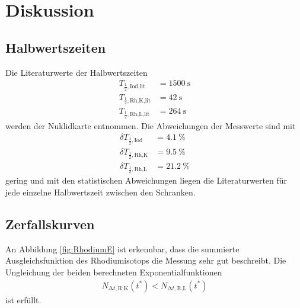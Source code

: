 \section{Diskussion}
\label{sec:Diskussion}

\subsection{Halbwertszeiten}

Die Literaturwerte der Halbwertszeiten
\begin{align}
  T_{\frac{1}{2},\text{Iod,lit}} & = \SI{1500}{\second} \\
  T_{\frac{1}{2},\text{Rh,K,lit}} & = \SI{42}{\second} \\
  T_{\frac{1}{2},\text{Rh,L,lit}} & = \SI{264}{\second}
\end{align}
werden der Nuklidkarte \cite{nuklid} entnommen.
Die Abweichungen der Messwerte sind mit
\begin{align}
  \delta T_{\frac{1}{2},\text{Iod}} & = \SI{4.1}{\percent} \\
  \delta T_{\frac{1}{2},\text{Rh,K}} & = \SI{9.5}{\percent} \\
  \delta T_{\frac{1}{2},\text{Rh,L}} & = \SI{21.2}{\percent}
\end{align}
gering und mit den statistischen Abweichungen liegen die Literaturwerten
für jede einzelne Halbwertszeit zwischen den Schranken.

\subsection{Zerfallskurven}

An Abbildung \ref{fig:RhodiumE} ist erkennbar, dass die summierte
Ausgleichsfunktion des Rhodiumisotops die Messung sehr gut beschreibt.
Die Ungleichung der beiden berechneten Exponentialfunktionen
\begin{align}
  N_{\increment t,\text{R,K}} (t^*) < N_{\increment t,\text{R,L}} (t^*)
\end{align}
ist erfüllt.

